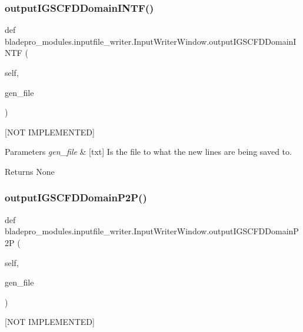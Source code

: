 \subsubsection{\texorpdfstring{output\+I\+G\+S\+C\+F\+D\+Domain\+I\+N\+T\+F()}{outputIGSCFDDomainINTF()}}
{\footnotesize\ttfamily def bladepro\+\_\+modules.\+inputfile\+\_\+writer.\+Input\+Writer\+Window.\+output\+I\+G\+S\+C\+F\+D\+Domain\+I\+N\+TF (\begin{DoxyParamCaption}\item[{}]{self,  }\item[{}]{gen\+\_\+file }\end{DoxyParamCaption})}



\mbox{[}N\+OT I\+M\+P\+L\+E\+M\+E\+N\+T\+ED\mbox{]} 


\begin{DoxyParams}{Parameters}
{\em gen\+\_\+file} & \mbox{[}txt\mbox{]} Is the file to what the new lines are being saved to. \\
\hline
\end{DoxyParams}
\begin{DoxyReturn}{Returns}
None 
\end{DoxyReturn}
\hypertarget{a00070_aa7a1b9b7db9021015b02a691075d88e3}{}\label{a00070_aa7a1b9b7db9021015b02a691075d88e3} 
\subsubsection{\texorpdfstring{output\+I\+G\+S\+C\+F\+D\+Domain\+P2\+P()}{outputIGSCFDDomainP2P()}}
{\footnotesize\ttfamily def bladepro\+\_\+modules.\+inputfile\+\_\+writer.\+Input\+Writer\+Window.\+output\+I\+G\+S\+C\+F\+D\+Domain\+P2P (\begin{DoxyParamCaption}\item[{}]{self,  }\item[{}]{gen\+\_\+file }\end{DoxyParamCaption})}



\mbox{[}N\+OT I\+M\+P\+L\+E\+M\+E\+N\+T\+ED\mbox{]} 


